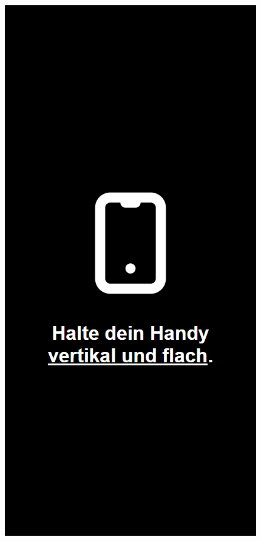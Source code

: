 \documentclass[a4paper,12pt]{scrartcl}
\begin{document}
\newpage

\begin{figure}[!h]
   \begin{minipage}[t]{.4\linewidth}
      \includegraphics[width=\linewidth]{Abbildungen/Snake_Controller_hint_1.png}

\end{minipage}
\end{figure}
\end{document}
